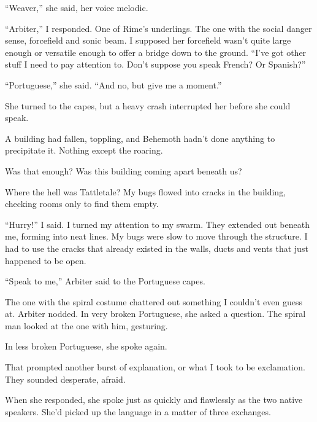 ``Weaver,'' she said, her voice melodic.



``Arbiter,'' I responded.  One of Rime's underlings.  The one with the social danger sense, forcefield and sonic beam.  I supposed her forcefield wasn't quite large enough or versatile enough to offer a bridge down to the ground.  ``I've got other stuff I need to pay attention to.  Don't suppose you speak French?  Or Spanish?''



``Portuguese,'' she said.  ``And no, but give me a moment.''



She turned to the capes, but a heavy crash interrupted her before she could speak.



A building had fallen, toppling, and Behemoth hadn't done anything to precipitate it.  Nothing except the roaring.



Was that enough?  Was this building coming apart beneath us?



Where the hell was Tattletale?  My bugs flowed into cracks in the building, checking rooms only to find them empty.



``Hurry!'' I said.  I turned my attention to my swarm.  They extended out beneath me, forming into neat lines.  My bugs were slow to move through the structure.  I had to use the cracks that already existed in the walls, ducts and vents that just happened to be open.



``Speak to me,'' Arbiter said to the Portuguese capes.



The one with the spiral costume chattered out something I couldn't even guess at.  Arbiter nodded.  In very broken Portuguese, she asked a question.  The spiral man looked at the one with him, gesturing.



In less broken Portuguese, she spoke again.



That prompted another burst of explanation, or what I took to be exclamation.  They sounded desperate, afraid.



When she responded, she spoke just as quickly and flawlessly as the two native speakers.  She'd picked up the language in a matter of three exchanges.



